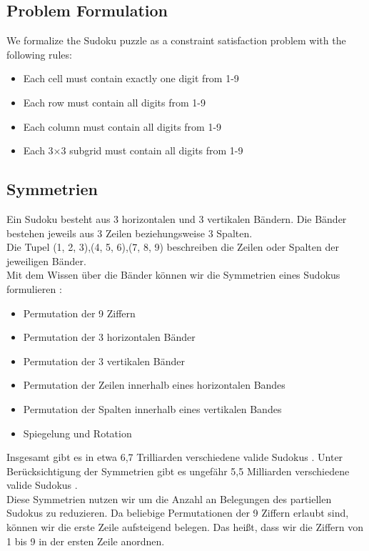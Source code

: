 \documentclass[12pt,a4paper]{article}
\begin{document}
\subsection{Problem Formulation}
We formalize the Sudoku puzzle as a constraint satisfaction problem with the following rules:
\begin{itemize}
    \item Each cell must contain exactly one digit from 1-9
    \item Each row must contain all digits from 1-9
    \item Each column must contain all digits from 1-9
    \item Each 3×3 subgrid must contain all digits from 1-9
\end{itemize}

\subsection{Symmetrien}
Ein Sudoku besteht aus 3 horizontalen und 3 vertikalen Bändern. Die Bänder bestehen jeweils aus 3 Zeilen beziehungsweise 3 Spalten. \\
Die Tupel (1, 2, 3),(4, 5, 6),(7, 8, 9) beschreiben die Zeilen oder Spalten der jeweiligen Bänder. \\
Mit dem Wissen über die Bänder können wir die Symmetrien eines Sudokus formulieren \cite{russell2006mathematics}: \\
\begin{itemize}
    \item Permutation der 9 Ziffern
    \item Permutation der 3 horizontalen Bänder
    \item Permutation der 3 vertikalen Bänder
    \item Permutation der Zeilen innerhalb eines horizontalen Bandes
    \item Permutation der Spalten innerhalb eines vertikalen Bandes
    \item Spiegelung und Rotation
\end{itemize}
Insgesamt gibt es in etwa 6,7 Trilliarden verschiedene valide Sudokus \cite{felgenhauer2006mathematics}. Unter Berücksichtigung der Symmetrien
gibt es ungefähr 5,5 Milliarden verschiedene valide Sudokus \cite{russell2006mathematics}. \\
Diese Symmetrien nutzen wir um die Anzahl an Belegungen des partiellen Sudokus zu reduzieren. Da beliebige Permutationen der 9 Ziffern  erlaubt sind,
können wir die erste Zeile aufsteigend belegen. Das heißt, dass wir die Ziffern von 1 bis 9 in der ersten Zeile anordnen. \\
\end{document}
